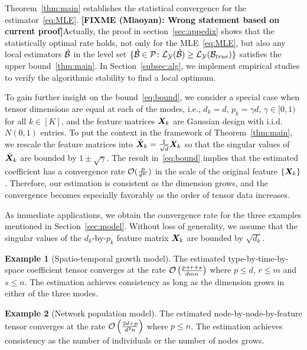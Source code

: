 \documentclass[12pt]{article}
\theoremstyle{plain}
\theoremstyle{definition}
\newtheorem{example}{Example}
\def\fixme#1#2{\textbf{\color{red}[FIXME (#1): #2]}}
\begin{document}
Theorem~\ref{thm:main} establishes the statistical convergence for the estimator~\eqref{eq:MLE}. \fixme{Miaoyan}{Wrong statement based on current proof}Actually, the proof in section~\ref{sec:appedix} shows that the statistically optimal rate holds, not only for the MLE~\eqref{eq:MLE},  but also any local estimators $\hat {\mathcal{B}}$ in the level set $\{\hat {\mathcal{B}} \in \mathcal{P} \colon \mathcal{L}_{\mathcal{Y}} (\hat {\mathcal{B}}) \geq \mathcal{L}_{\mathcal{Y}} (\mathcal{B}_{true}) \}$ satisfies the upper bound~\ref{thm:main}. In Section~\ref{subsec:alg}, we implement empirical studies to verify the algorithmic stability to find a local optimum.


To gain further insight on the bound~\eqref{eq:bound}, we consider a special case when tensor dimensions are equal at each of the modes, i.e., $d_k=d$, $p_k=\gamma d$, $\gamma\in [0,1)$ for all $k\in[K]$, and the feature matrices $\bm X_k$ are Gaussian design with i.i.d.\ $N(0,1)$ entries. To put the context in the framework of Theorem~\ref{thm:main}, we rescale the feature matrices into $\check {\bm X}_k={1\over \sqrt{d}}\bm X_k$ so that the singular values of $\check {\bm X}_k$ are bounded by $1\pm \sqrt{\gamma}$. The result in~\eqref{eq:bound} implies that the estimated coefficient has a convergence rate $\mathcal{O}({p\over d^K})$ in the scale of the original feature $\{\bm X_k\}$. Therefore, our estimation is consistent as the dimension grows, and the convergence becomes especially favorably as the order of tensor data increases. 

As immediate applications, we obtain the convergence rate for the three examples mentioned in Section~\ref{sec:model}. Without loss of generality, we assume that the singular values of the $d_k$-by-$p_k$ feature matrix $\bm X_k$ are bounded by $\sqrt{d_k}$. 


\begin{example}[Spatio-temporal growth model] The estimated type-by-time-by-space coefficient tensor converges at the rate $\mathcal{O}\left({p+r+s\over dmn}\right)$ where $p\leq d$, $r\leq m$ and $s\leq n$. The estimation achieves consistency as long as the dimension grows in either of the three modes.
\end{example}

\begin{example} [Network population model] The estimated node-by-node-by-feature tensor converges at the rate $\mathcal{O}\left({2d+p\over d^2n}\right)$ where $p\leq n$. The estimation achieves consistency as the number of individuals or the number of nodes grows. 
\end{example}
\end{document}

